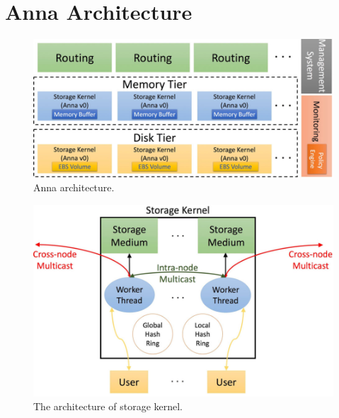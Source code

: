 \documentclass[14pt,oneside]{extreport}
\begin{document}
  \section{Anna Architecture}
  \begin{figure}[H]
    \centerline{\includegraphics[scale=0.5]{images/paper2/architecture.png}}
    \caption{Anna architecture.}
    \label{Anna architecture.}
  \end{figure}

  \begin{figure}[H]
    \centerline{\includegraphics[scale=0.5]{images/paper2/storage_kernel.png}}
    \caption{The architecture of storage kernel.}
    \label{The architecture of storage kernel.}
  \end{figure}
\end{document}
